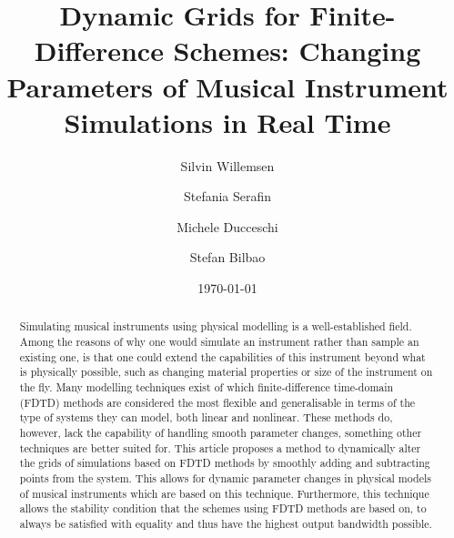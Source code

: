 \documentclass[preprint]{JASA}
\begin{document}
\title[JASA/Dynamic Grids for Finite-Difference Schemes]{Dynamic Grids for Finite-Difference Schemes: Changing Parameters of Musical Instrument Simulations in Real Time}
\author{Silvin Willemsen}
\author{Stefania Serafin}

\author{Michele Ducceschi}
\author{Stefan Bilbao}
 



\date{\today} 

\begin{abstract}
Simulating musical instruments using physical modelling is a well-established field. Among the reasons of why one would simulate an instrument rather than sample an existing one, is that one could extend the capabilities of this instrument beyond what is physically possible, such as changing material properties or size of the instrument on the fly. Many modelling techniques exist of which finite-difference time-domain (FDTD) methods are considered the most flexible and generalisable in terms of the type of systems they can model, both linear and nonlinear. These methods do, however, lack the capability of handling smooth parameter changes, something other techniques are better suited for. This article proposes a method to dynamically alter the grids of simulations based on FDTD methods by smoothly adding and subtracting points from the system. This allows for dynamic parameter changes in physical models of musical instruments which are based on this technique. Furthermore, this technique allows the stability condition that the schemes using FDTD methods are based on, to always be satisfied with equality and thus have the highest output bandwidth possible. 
\end{abstract}


\maketitle

\end{document}
